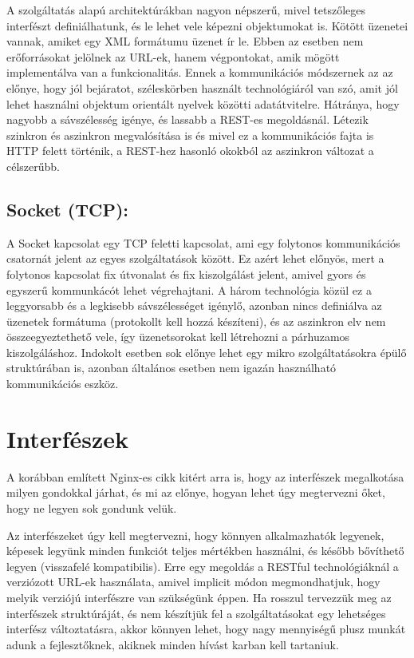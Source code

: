 \documentclass[11pt,magyar,a4paper,oneside,]{report}
\begin{document}
A szolgáltatás alapú architektúrákban nagyon népszerű, mivel tetszőleges
interfészt definiálhatunk, és le lehet vele képezni objektumokat is.
Kötött üzenetei vannak, amiket egy XML formátumu üzenet ír le. Ebben az
esetben nem erőforrásokat jelölnek az URL-ek, hanem végpontokat, amik
mögött implementálva van a funkcionalitás. Ennek a kommunikációs
módszernek az az előnye, hogy jól bejáratot, széleskörben használt
technológiáról van szó, amit jól lehet használni objektum orientált
nyelvek közötti adatátvitelre. Hátránya, hogy nagyobb a sávszélesség
igénye, és lassabb a REST-es megoldásnál. Létezik szinkron és aszinkron
megvalósítása is és mivel ez a kommunikációs fajta is HTTP felett
történik, a REST-hez hasonló okokból az aszinkron változat a célszerűbb.

\subsection{\texorpdfstring{Socket
(TCP)\citep{socket}:}{Socket (TCP){[}@socket{]}:}}\label{socket-tcpsocket}

A Socket kapcsolat egy TCP feletti kapcsolat, ami egy folytonos
kommunikációs csatornát jelent az egyes szolgáltatások között. Ez azért
lehet előnyös, mert a folytonos kapcsolat fix útvonalat és fix
kiszolgálást jelent, amivel gyors és egyszerű kommunkácót lehet
végrehajtani. A három technológia közül ez a leggyorsabb és a legkisebb
sávszélességet igénylő, azonban nincs definiálva az üzenetek formátuma
(protokollt kell hozzá készíteni), és az aszinkron elv nem
összeegyeztethető vele, így üzenetsorokat kell létrehozni a párhuzamos
kiszolgáláshoz. Indokolt esetben sok előnye lehet egy mikro
szolgáltatásokra épülő struktúrában is, azonban általános esetben nem
igazán használható kommunikációs eszköz.

\section{Interfészek}\label{interfuxe9szek}

A korábban említett Nginx-es cikk\citep{micro-communication} kitért arra
is, hogy az interfészek megalkotása milyen gondokkal járhat, és mi az
előnye, hogyan lehet úgy megtervezni őket, hogy ne legyen sok gondunk
velük.

Az interfészeket úgy kell megtervezni, hogy könnyen alkalmazhatók
legyenek, képesek legyünk minden funkciót teljes mértékben használni, és
később bővíthető legyen (visszafelé kompatibilis). Erre egy megoldás a
RESTful technológiáknál a verziózott URL-ek használata, amivel implicit
módon megmondhatjuk, hogy melyik verziójú interfészre van szükségünk
éppen. Ha rosszul tervezzük meg az interfészek struktúráját, és nem
készítjük fel a szolgáltatásokat egy lehetséges interfész változtatásra,
akkor könnyen lehet, hogy nagy mennyiségű plusz munkát adunk a
fejlesztőknek, akiknek minden hívást karban kell tartaniuk.
\end{document}
